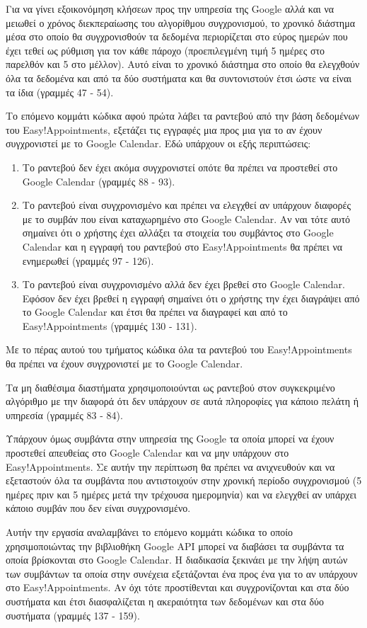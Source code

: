 Για να γίνει εξοικονόμηση κλήσεων προς την υπηρεσία της Google αλλά και να μειωθεί ο χρόνος διεκπεραίωσης του αλγορίθμου συγχρονισμού, το χρονικό διάστημα μέσα στο οποίο θα συγχρονισθούν τα δεδομένα περιορίζεται στο εύρος ημερών που έχει τεθεί ως ρύθμιση για τον κάθε πάροχο (προεπιλεγμένη τιμή 5 ημέρες στο παρελθόν και 5 στο μέλλον). Αυτό είναι το χρονικό διάστημα στο οποίο θα ελεγχθούν όλα τα δεδομένα και από τα δύο συστήματα και θα συντονιστούν έτσι ώστε να είναι τα ίδια (γραμμές 47 - 54).

Το επόμενο κομμάτι κώδικα αφού πρώτα λάβει τα ραντεβού από την βάση δεδομένων του Easy!Appointments, εξετάζει τις εγγραφές μια προς μια για το αν έχουν συγχρονιστεί με το Google Calendar. Εδώ υπάρχουν οι εξής περιπτώσεις:
\begin{enumerate}
\item Το ραντεβού δεν έχει ακόμα συγχρονιστεί οπότε θα πρέπει να προστεθεί στο Google Calendar (γραμμές 88 - 93).
\item Το ραντεβού είναι συγχρονισμένο και πρέπει να ελεγχθεί αν υπάρχουν διαφορές με το συμβάν που είναι καταχωρημένο στο Google Calendar. Αν ναι τότε αυτό σημαίνει ότι ο χρήστης έχει αλλάξει τα στοιχεία του συμβάντος στο Google Calendar και η εγγραφή του ραντεβού στο Easy!Appointments θα πρέπει να ενημερωθεί (γραμμές 97 - 126).
\item Το ραντεβού είναι συγχρονισμένο αλλά δεν έχει βρεθεί στο Google Calendar. Εφόσον δεν έχει βρεθεί η εγγραφή σημαίνει ότι ο χρήστης την έχει διαγράψει από το Google Calendar και έτσι θα πρέπει να διαγραφεί και από το Easy!Appointments (γραμμές 130 - 131).
\end{enumerate}
Με το πέρας αυτού του τμήματος κώδικα όλα τα ραντεβού του Easy!Appointments θα πρέπει να έχουν συγχρονιστεί με το Google Calendar.

Τα μη διαθέσιμα διαστήματα χρησιμοποιούνται ως ραντεβού στον συγκεκριμένο αλγόριθμο με την διαφορά ότι δεν υπάρχουν σε αυτά πληοροφίες για κάποιο πελάτη ή υπηρεσία (γραμμές 83 - 84).

Υπάρχουν όμως συμβάντα στην υπηρεσία της Google τα οποία μπορεί να έχουν προστεθεί απευθείας στο Google Calendar και να μην υπάρχουν στο Easy!Appointments. Σε αυτήν την περίπτωση θα πρέπει να ανιχνευθούν και να εξεταστούν όλα τα συμβάντα που αντιστοιχούν στην χρονική περίοδο συγχρονισμού (5 ημέρες πριν και 5 ημέρες μετά την τρέχουσα ημερομηνία) και να ελεγχθεί αν υπάρχει κάποιο συμβάν που δεν είναι συγχρονισμένο. 

Αυτήν την εργασία αναλαμβάνει το επόμενο κομμάτι κώδικα το οποίο χρησιμοποιώντας την βιβλιοθήκη Google API μπορεί να διαβάσει τα συμβάντα τα οποία βρίσκονται στο Google Calendar. Η διαδικασία ξεκινάει με την λήψη αυτών των συμβάντων τα οποία στην συνέχεια εξετάζονται ένα προς ένα για το αν υπάρχουν στο Easy!Appointments. Αν όχι τότε προστίθενται και συγχρονίζονται και στα δύο συστήματα και έτσι διασφαλίζεται η ακεραιότητα των δεδομένων και στα δύο συστήματα (γραμμές 137 - 159). 

